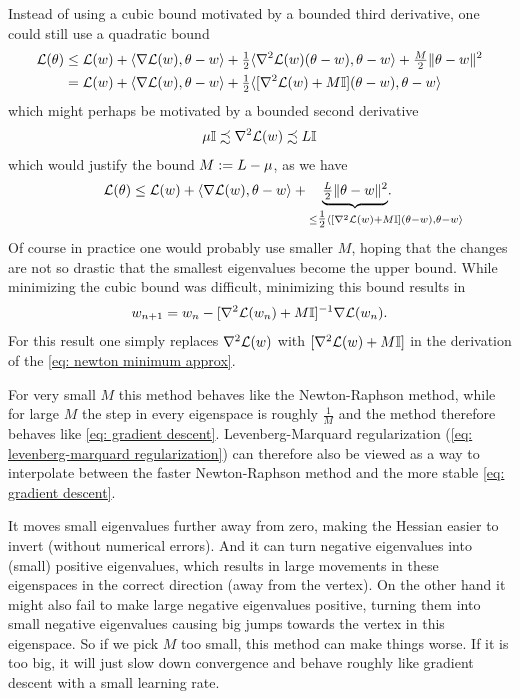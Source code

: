 Instead of using a cubic bound motivated by a bounded third derivative, one
could still use a quadratic bound
\begin{align*}
	\mathcal{L}(\theta)
	&\le \mathcal{L}(w) + \langle \nabla\mathcal{L}(w), \theta-w \rangle
	+ \tfrac12\langle \nabla^2\mathcal{L}(w)(\theta-w), \theta-w \rangle
	+ \tfrac{M}2\|\theta-w\|^2\\
	&= \mathcal{L}(w) + \langle \nabla\mathcal{L}(w), \theta-w \rangle
	+ \tfrac12\langle [\nabla^2\mathcal{L}(w)+M\mathbb{I}](\theta-w), \theta-w \rangle
\end{align*}
which might perhaps be motivated by a bounded second derivative
\begin{align*}
	\mu\mathbb{I} \precsim \nabla^2\mathcal{L}(w) \precsim L\mathbb{I}
\end{align*}
which would justify the bound \(M:=L-\mu\), as we have
\begin{align}
	\label{eq: levenberg-marquard justification}
	\Loss(\theta)
	&\le \Loss(\weights) + \langle \nabla\Loss(\weights), \theta-\weights \rangle
	+ \underbrace{\tfrac{\ubound}2\|\theta-\weights\|^2\mathrlap{.}}_{
		\le \tfrac12\langle
			[\nabla^2\Loss(\weights)+M\identity]
		\mathrlap{
			(\theta-\weights),
				\theta-\weights
			\rangle
		}
	}
\end{align}
Of course in practice one would probably use smaller \(M\), hoping that
the changes are not so drastic that the smallest eigenvalues become the
upper bound. While minimizing the cubic bound was difficult, minimizing this
bound results in
\begin{align}\label{eq: levenberg-marquard regularization}
	w_{n+1}
	= w_n - [\nabla^2\mathcal{L}(w_n)+M\mathbb{I}]^{-1}\nabla\mathcal{L}(w_n).
\end{align}
For this result one simply replaces \(\nabla^2\mathcal{L}(w)\) with
\([\nabla^2\mathcal{L}(w)+M\mathbb{I}]\) in the derivation of the \ref{eq:
newton minimum approx}.

For very small \(M\) this method behaves like the Newton-Raphson method, while
for large \(M\) the step in every eigenspace is roughly \(\tfrac1M\) and the
method therefore behaves like \ref{eq: gradient descent}. Levenberg-Marquard
regularization (\ref{eq: levenberg-marquard regularization}) can therefore also
be viewed as a way to interpolate between the faster Newton-Raphson method and
the more stable \ref{eq: gradient descent}. 

It moves small eigenvalues further away from zero, making the Hessian easier to invert (without numerical errors). And it can turn negative eigenvalues into
(small) positive eigenvalues, which results in large movements in these
eigenspaces in the correct direction (away from the vertex). On the other hand
it might also fail to make large negative eigenvalues positive, turning them into
small negative eigenvalues causing big jumps towards the vertex in this
eigenspace. So if we pick \(M\) too small, this method can make things worse.
If it is too big, it will just slow down convergence and behave roughly like
gradient descent with a small learning rate. 

